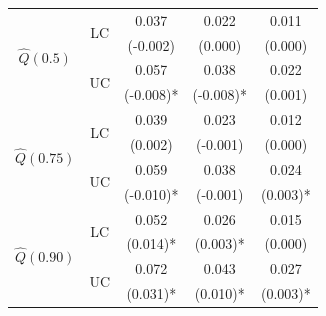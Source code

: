 \begin{table}
\begin{center}
\begin{tabular}{| c | c | c | c |  c | }
	\hline


	\multirow{4}{*}{$\hat Q(0.5)$}	& \multirow{2}{*}{LC}	&	0.037		& 0.022	& 0.011	\\
						&					&	(-0.002)		& (0.000)	& (0.000)	\\	
	
						\cline{2- 5}
	
						& \multirow{2}{*}{UC}		&	0.057		& 0.038		& 0.022	\\
						&					&	(-0.008)*		& (-0.008)*	& (0.001)	\\
	
	\hline										
	
	\multirow{4}{*}{$\hat Q(0.75)$}	& \multirow{2}{*}{LC}	&	0.039		& 0.023	& 0.012	\\
						&					&	(0.002)		& (-0.001)	& (0.000)	\\	
	
						\cline{2- 5}
	
						& \multirow{2}{*}{UC}		&	0.059		& 0.038	& 0.024	\\
						&					&	(-0.010)*		& (-0.001)	& (0.003)*	\\
	\hline

	\multirow{4}{*}{$\hat Q(0.90)$}	& \multirow{2}{*}{LC}	&	0.052		& 0.026	& 0.015	\\
						&					&	(0.014)*		& (0.003)*	&(0.000)	\\	
	
	
						\cline{2- 5}
	
						& \multirow{2}{*}{UC}		&	0.072		& 0.043	& 0.027	\\
						&					&	(0.031)*		& (0.010)*	& (0.003)*	\\

		

\hline



\hline

\hline


\end{tabular}
\end{center}
\end{table}



